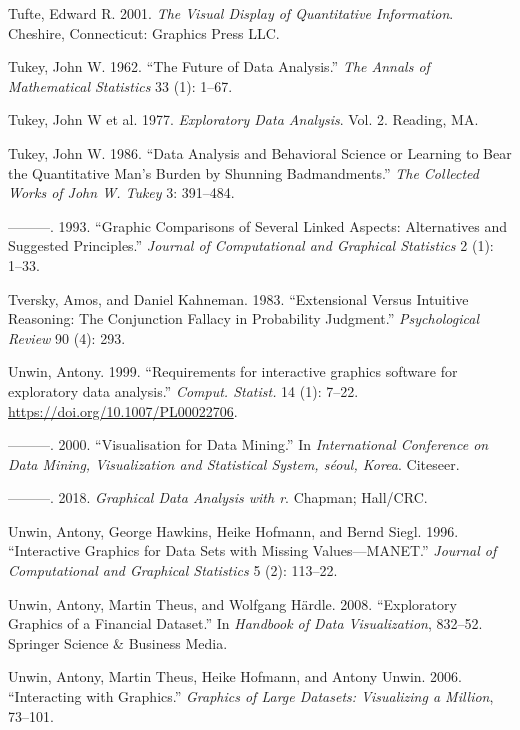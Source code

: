 \documentclass[
]{book}
\newlength{\cslhangindent}
\newenvironment{CSLReferences}[2] %
 {\begin{list}{}{%
  \setlength{\itemindent}{0pt}
  \setlength{\leftmargin}{0pt}
  \setlength{\parsep}{0pt}
  \ifodd #1
   \setlength{\leftmargin}{\cslhangindent}
   \setlength{\itemindent}{-1\cslhangindent}
  \fi
  \setlength{\itemsep}{#2\baselineskip}}}
 {\end{list}}
\theoremstyle{definition}
\theoremstyle{definition}
\theoremstyle{definition}
\theoremstyle{definition}
\theoremstyle{remark}
\begin{document}
\begin{CSLReferences}{1}{0}
Tufte, Edward R. 2001. \emph{The Visual Display of Quantitative Information}. Cheshire, Connecticut: Graphics Press LLC.

Tukey, John W. 1962. {``The Future of Data Analysis.''} \emph{The Annals of Mathematical Statistics} 33 (1): 1--67.

Tukey, John W et al. 1977. \emph{Exploratory Data Analysis}. Vol. 2. Reading, MA.

Tukey, John W. 1986. {``Data Analysis and Behavioral Science or Learning to Bear the Quantitative Man's Burden by Shunning Badmandments.''} \emph{The Collected Works of John W. Tukey} 3: 391--484.

---------. 1993. {``Graphic Comparisons of Several Linked Aspects: Alternatives and Suggested Principles.''} \emph{Journal of Computational and Graphical Statistics} 2 (1): 1--33.

Tversky, Amos, and Daniel Kahneman. 1983. {``Extensional Versus Intuitive Reasoning: The Conjunction Fallacy in Probability Judgment.''} \emph{Psychological Review} 90 (4): 293.

Unwin, Antony. 1999. {``{Requirements for interactive graphics software for exploratory data analysis}.''} \emph{Comput. Statist.} 14 (1): 7--22. \url{https://doi.org/10.1007/PL00022706}.

---------. 2000. {``Visualisation for Data Mining.''} In \emph{International Conference on Data Mining, Visualization and Statistical System, s{é}oul, Korea}. Citeseer.

---------. 2018. \emph{Graphical Data Analysis with r}. Chapman; Hall/CRC.

Unwin, Antony, George Hawkins, Heike Hofmann, and Bernd Siegl. 1996. {``Interactive Graphics for Data Sets with Missing Values---MANET.''} \emph{Journal of Computational and Graphical Statistics} 5 (2): 113--22.

Unwin, Antony, Martin Theus, and Wolfgang Härdle. 2008. {``Exploratory Graphics of a Financial Dataset.''} In \emph{Handbook of Data Visualization}, 832--52. Springer Science \& Business Media.

Unwin, Antony, Martin Theus, Heike Hofmann, and Antony Unwin. 2006. {``Interacting with Graphics.''} \emph{Graphics of Large Datasets: Visualizing a Million}, 73--101.


\end{CSLReferences}
\end{document}
